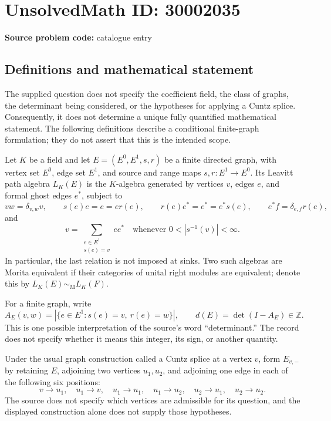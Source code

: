 \documentclass[11pt]{article}
\newcommand{\Z}{\mathbb{Z}}
\begin{document}
\section*{UnsolvedMath ID: 30002035}
\textbf{Source problem code:} catalogue entry
\subsection{Definitions and mathematical statement}
The supplied question does not specify the coefficient field, the class of graphs, the determinant being considered, or the hypotheses for applying a Cuntz splice. Consequently, it does not determine a unique fully quantified mathematical statement. The following definitions describe a conditional finite-graph formulation; they do not assert that this is the intended scope.

Let \(K\) be a field and let \(E=(E^0,E^1,s,r)\) be a finite directed graph, with vertex set \(E^0\), edge set \(E^1\), and source and range maps \(s,r:E^1\to E^0\). Its Leavitt path algebra \(L_K(E)\) is the \(K\)-algebra generated by vertices \(v\), edges \(e\), and formal ghost edges \(e^*\), subject to
\[
 vw=\delta_{v,w}v,\qquad
 s(e)e=e=er(e),\qquad
 r(e)e^*=e^*=e^*s(e),\qquad
 e^*f=\delta_{e,f}r(e),
\]
and
\[
 v=\sum_{\substack{e\in E^1\\s(e)=v}}ee^*
 \quad\text{whenever }0<|s^{-1}(v)|<\infty.
\]
In particular, the last relation is not imposed at sinks. Two such algebras are Morita equivalent if their categories of unital right modules are equivalent; denote this by \(L_K(E)\sim_{\mathrm M}L_K(F)\).

For a finite graph, write
\[
 A_E(v,w)=|\{e\in E^1:s(e)=v,\ r(e)=w\}|,
 \qquad d(E)=\det(I-A_E)\in\Z.
\]
This is one possible interpretation of the source's word ``determinant.'' The record does not specify whether it means this integer, its sign, or another quantity.

Under the usual graph construction called a Cuntz splice at a vertex \(v\), form \(E_{v,-}\) by retaining \(E\), adjoining two vertices \(u_1,u_2\), and adjoining one edge in each of the following six positions:
\[
 v\longrightarrow u_1,\quad u_1\longrightarrow v,\quad
 u_1\longrightarrow u_1,\quad u_1\longrightarrow u_2,\quad
 u_2\longrightarrow u_1,\quad u_2\longrightarrow u_2.
\]
The source does not specify which vertices are admissible for its question, and the displayed construction alone does not supply those hypotheses.
\end{document}
